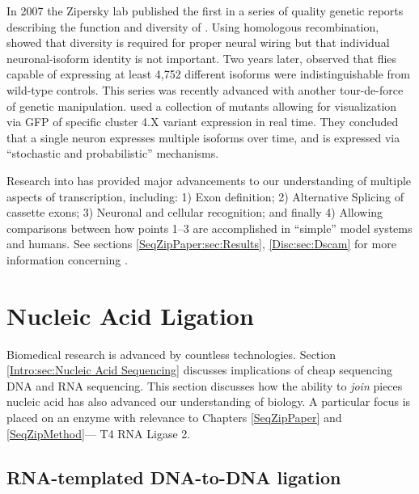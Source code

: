     In 2007 the Zipersky lab published \citep{Hattori2007} the first in a series of quality genetic reports describing the function and diversity of \dscam{}. Using homologous recombination, \citet{Hattori2007} showed that \dscam{} diversity is required for proper neural wiring but that individual neuronal-isoform identity is not important. Two years later, \citet{Hattori2009} observed that flies capable of expressing at least 4,752 different \dscam{} isoforms were indistinguishable from wild-type controls. This series was recently advanced with another tour-de-force of genetic manipulation. \citet{Miura2013b} used a collection of \dscam{} mutants allowing for visualization via GFP of specific cluster 4.X variant expression in real time. They concluded that a single neuron expresses multiple \dscam{} isoforms over time, and \dscam{} is expressed via ``stochastic and probabilistic'' mechanisms.

    Research into \flies{} \dscam{} has provided major advancements to our understanding of multiple aspects of transcription, including: 1) Exon definition; 2) Alternative Splicing of cassette exons; 3) Neuronal and cellular recognition; and finally 4) Allowing comparisons between how points 1--3 are accomplished in ``simple'' model systems and humans. See sections \ref{SeqZipPaper:sec:Results}, \ref{Disc:sec:Dscam} for more information concerning \dscam{}.

\section{Nucleic Acid Ligation}
  \label{Intro:sec:Nucleic Acid Ligation}

  Biomedical research is advanced by countless technologies. Section \ref{Intro:sec:Nucleic Acid Sequencing} discusses implications of cheap sequencing DNA and RNA sequencing. This section discusses how the ability to \textit{join} pieces nucleic acid has also advanced our understanding of biology. A particular focus is placed on an enzyme with relevance to Chapters \ref{SeqZipPaper} and \ref{SeqZipMethod}--- T4 RNA Ligase 2.

  \subsection{RNA-templated DNA-to-DNA ligation}
    \label{Intro:subsec:Ligation}

